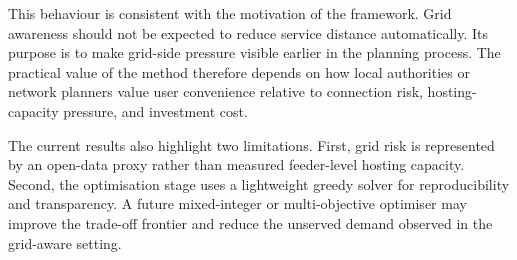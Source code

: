 This behaviour is consistent with the motivation of the framework. Grid awareness should not be expected to reduce service distance automatically. Its purpose is to make grid-side pressure visible earlier in the planning process. The practical value of the method therefore depends on how local authorities or network planners value user convenience relative to connection risk, hosting-capacity pressure, and investment cost.

The current results also highlight two limitations. First, grid risk is represented by an open-data proxy rather than measured feeder-level hosting capacity. Second, the optimisation stage uses a lightweight greedy solver for reproducibility and transparency. A future mixed-integer or multi-objective optimiser may improve the trade-off frontier and reduce the unserved demand observed in the grid-aware setting.
